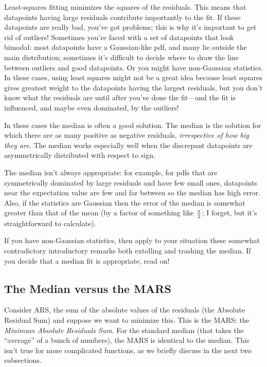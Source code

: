 \documentclass[psfig,preprint]{aastex}
\begin{document}
\label{medianfitting}

	Least-squares fitting minimizes the squares of the residuals.
This means that datapoints having large residuals contribute importantly
to the fit. If these datapoints are really bad, you've got problems;
this is why it's important to get rid of outliers! Sometimes you're
faced with a set of datapoints that look bimodal: most datapoints have a
Gaussian-like pdf, and many lie outside the main distribution; sometimes
it's difficult to decide where to draw the line between outliers and
good datapoints. Or you might have non-Gaussian statistics. In these
cases, using least squares might not be a great idea because least
squares gives greatest weight to the datapoints having the largest
residuals, but you don't know what the residuals are until after you've
done the fit---and the fit is influenced, and maybe even dominated, by
the outliers!

	In these cases the median is often a good solution. The median
is the solution for which there are as many positive as negative residuals,
{\it irrespective of how big they are}. The median works especially well
when the discrepant datapoints are asymmetrically distributed with
respect to sign. 

	The median isn't always appropriate: for example, for pdfs that
are symmetrically dominated by large residuals and have few small ones,
datapoints near the expectation value are few and far between so the
median has high error. Also, if the statistics are Gaussian then the
error of the median is somewhat greater than that of the mean (by a
factor of something like ${\pi \over 2}$; I forget, but it's
straightforward to calculate).

	If you have non-Gaussian statistics, then apply to your situation
these somewhat contradictory introductory remarks both extolling and
trashing the median. If you decide that a median fit is appropriate,
read on!

\subsection{ The Median versus the MARS}

	Consider ARS, the sum of the absolute values of the residuals
(the Absolute Residual Sum) and suppose we want to minimize this. This
is the MARS: the {\it Minimum Absolute Residuals Sum}. For the standard
median (that takes the ``average'' of a bunch of numbers), the MARS is
identical to the median. This isn't true for more complicated functions,
as we briefly discuss in the next two subsections.
\end{document}
